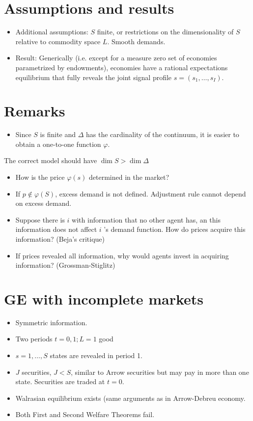 \documentclass[10pt]{article}
\begin{document}
\section*{Assumptions and results}
\begin{itemize}
  \item Additional assumptions: $S$ finite, or restrictions on the dimensionality of $S$ relative to commodity space $L$. Smooth demands.
  \item Result: Generically (i.e. except for a measure zero set of economies parametrized by endowments), economies have a rational expectations equilibrium that fully reveals the joint signal profile $s=\left(s_{1}, \ldots, s_{I}\right)$.
\end{itemize}

\section*{Remarks}
\begin{itemize}
  \item Since $S$ is finite and $\Delta$ has the cardinality of the continuum, it is easier to obtain a one-to-one function $\varphi$.
\end{itemize}

The correct model should have $\operatorname{dim} S>\operatorname{dim} \Delta$

\begin{itemize}
  \item How is the price $\varphi(s)$ determined in the market?
  \item If $p \notin \varphi(S)$, excess demand is not defined. Adjustment rule cannot depend on excess demand.
  \item Suppose there is $i$ with information that no other agent has, an this information does not affect $i$ 's demand function. How do prices acquire this information? (Beja's critique)
  \item If prices revealed all information, why would agents invest in acquiring information? (Grossman-Stiglitz)
\end{itemize}

\section*{GE with incomplete markets}
\begin{itemize}
  \item Symmetric information.
  \item Two periods $t=0,1 ; L=1$ good
  \item $s=1, \ldots, S$ states are revealed in period 1.
  \item $J$ securities, $J<S$, similar to Arrow securities but may pay in more than one state. Securities are traded at $t=0$.
  \item Walrasian equilibrium exists (same arguments as in Arrow-Debreu economy.
  \item Both First and Second Welfare Theorems fail.
\end{itemize}
\end{document}
